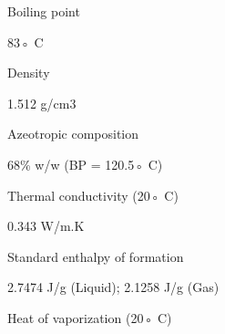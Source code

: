 \documentclass[a4paper,portrait,12pt]{article}
\begin{document}
\begin{flushleft}
Boiling point
\end{flushleft}





\begin{flushleft}
83◦ C
\end{flushleft}





\begin{flushleft}
Density
\end{flushleft}





\begin{flushleft}
1.512 g/cm3
\end{flushleft}





\begin{flushleft}
Azeotropic composition
\end{flushleft}





\begin{flushleft}
68\% w/w (BP = 120.5◦ C)
\end{flushleft}





\begin{flushleft}
Thermal conductivity (20◦ C)
\end{flushleft}





\begin{flushleft}
0.343 W/m.K
\end{flushleft}





\begin{flushleft}
Standard enthalpy of formation
\end{flushleft}





\begin{flushleft}
2.7474 J/g (Liquid); 2.1258 J/g (Gas)
\end{flushleft}





\begin{flushleft}
Heat of vaporization (20◦ C)
\end{flushleft}
\end{document}
